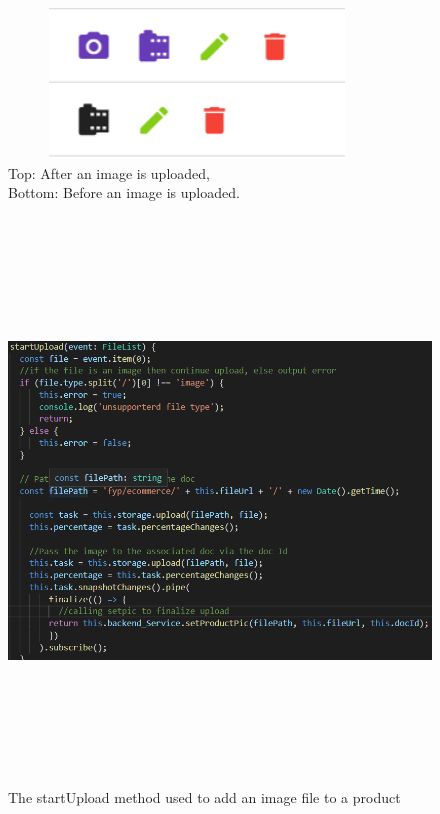 \begin{figure}[h!]
    \caption{Top: After an image is uploaded,\\
             Bottom: Before an image is uploaded.}
	\centering
	\includegraphics[width=10cm, height=4cm]{images/photoupload.png}
\end{figure}

\begin{figure}[h!]
    \caption{The startUpload method used to add an image file to a product}
	\centering
	\includegraphics[width=15cm, height=15cm]{images/uploadmethod.png}
\end{figure}




















